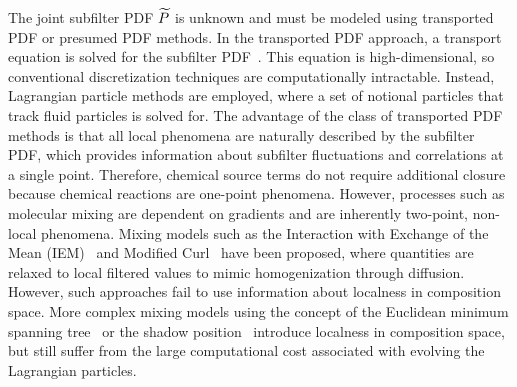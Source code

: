 The joint subfilter PDF $\widetilde{P}$ is unknown and must be modeled using transported PDF or presumed PDF methods. In the transported PDF approach, a transport equation is solved for the subfilter PDF~\cite{pope1985,pope1991}. This equation is high-dimensional, so conventional discretization techniques are computationally intractable. Instead, Lagrangian particle methods are employed, where a set of notional particles that track fluid particles is solved for. The advantage of the class of transported PDF methods is that all local phenomena are naturally described by the subfilter PDF, which provides information about subfilter fluctuations and correlations at a single point. Therefore, chemical source terms do not require additional closure because chemical reactions are one-point phenomena. However, processes such as molecular mixing are dependent on gradients and are inherently two-point, non-local phenomena. Mixing models such as the Interaction with Exchange of the Mean (IEM)~\cite{dopazo1974} and Modified Curl~\cite{janicka1979} have been proposed, where quantities are relaxed to local filtered values to mimic homogenization through diffusion. However, such approaches fail to use information about localness in composition space. More complex mixing models using the concept of the Euclidean minimum spanning tree~\cite{subramaniam1998} or the shadow position~\cite{pope2013} introduce localness in composition space, but still suffer from the large computational cost associated with evolving the Lagrangian particles.



